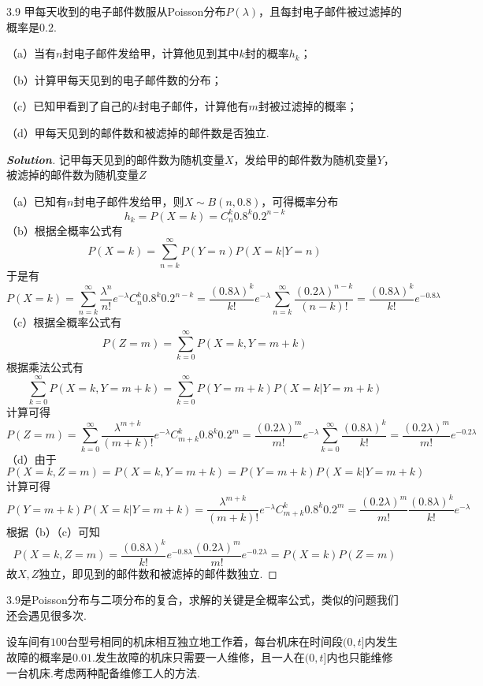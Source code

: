 \documentclass[10pt, a4paper, oneside]{ctexart}
\newenvironment{solution}{\begin{proof}[\bf Solution]}{\end{proof}}
\begin{document}
3.9 甲每天收到的电子邮件数服从Poisson分布$P(\lambda)$，且每封电子邮件被过滤掉的概率是$0.2$.

（a）当有$n$封电子邮件发给甲，计算他见到其中$k$封的概率$h_k$；

（b）计算甲每天见到的电子邮件数的分布；

（c）已知甲看到了自己的$k$封电子邮件，计算他有$m$封被过滤掉的概率；

（d）甲每天见到的邮件数和被滤掉的邮件数是否独立.
\begin{solution}
记甲每天见到的邮件数为随机变量$X$，发给甲的邮件数为随机变量$Y$，被滤掉的邮件数为随机变量$Z$

（a）已知有$n$封电子邮件发给甲，则$X\sim B(n,0.8)$，可得概率分布
\[{h_k} = P(X = k) = C_n^k{0.8^k}{0.2^{n - k}}\]
（b）根据全概率公式有
\[P(X = k) = \sum\limits_{n = k}^\infty  {P(Y = n)P(X = k|Y = n)} \]
于是有
\[P(X = k) = \sum\limits_{n = k}^\infty  {\frac{{{\lambda ^n}}}{{n!}}{e^{ - \lambda }}C_n^k{{0.8}^k}{{0.2}^{n - k}}}  = \frac{{{{(0.8\lambda )}^k}}}{{k!}}{e^{ - \lambda }}\sum\limits_{n = k}^\infty  {\frac{{{{(0.2\lambda )}^{n - k}}}}{{(n - k)!}}}  = \frac{{{{(0.8\lambda )}^k}}}{{k!}}{e^{ - 0.8\lambda }}\]
（c）根据全概率公式有
\[P(Z = m) = \sum\limits_{k = 0}^\infty  {P(X = k,Y = m + k)} \]
根据乘法公式有
\[\sum\limits_{k = 0}^\infty  {P(X = k,Y = m + k)}  = \sum\limits_{k = 0}^\infty  {P(Y = m + k)P(X = k|Y = m + k)} \]
计算可得
\[P(Z = m) = \sum\limits_{k = 0}^\infty  {\frac{{{\lambda ^{m + k}}}}{{(m + k)!}}{e^{ - \lambda }}C_{m + k}^k{{0.8}^k}{{0.2}^m}}  = \frac{{{{(0.2\lambda )}^m}}}{{m!}}{e^{ - \lambda }}\sum\limits_{k = 0}^\infty  {\frac{{{{(0.8\lambda )}^k}}}{{k!}}}  = \frac{{{{(0.2\lambda )}^m}}}{{m!}}{e^{ - 0.2\lambda }}\]
（d）由于
\[P(X = k,Z = m) = P(X = k,Y = m + k) = P(Y = m + k)P(X = k|Y = m + k)\]
计算可得
\[P(Y = m + k)P(X = k|Y = m + k) = \frac{{{\lambda ^{m + k}}}}{{(m + k)!}}{e^{ - \lambda }}C_{m + k}^k{0.8^k}{0.2^m} = \frac{{{{(0.2\lambda )}^m}}}{{m!}}\frac{{{{(0.8\lambda )}^k}}}{{k!}}{e^{ - \lambda }}\]
根据（b）（c）可知
\[P(X = k,Z = m) = \frac{{{{(0.8\lambda )}^k}}}{{k!}}{e^{ - 0.8\lambda }}\frac{{{{(0.2\lambda )}^m}}}{{m!}}{e^{ - 0.2\lambda }} = P(X = k)P(Z = m)\]
故$X,Z$独立，即见到的邮件数和被滤掉的邮件数独立.
\end{solution}
\begin{remark}
3.9是Poisson分布与二项分布的复合，求解的关键是全概率公式，类似的问题我们还会遇见很多次.
\end{remark}
 设车间有$100$台型号相同的机床相互独立地工作着，每台机床在时间段$(0,t]$内发生故障的概率是$0.01$.发生故障的机床只需要一人维修，且一人在$(0,t]$内也只能维修一台机床.考虑两种配备维修工人的方法.
\end{document}
